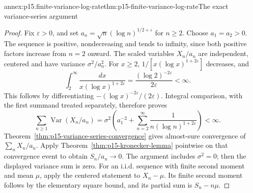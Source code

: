 \begin{annexitem}{annex:p15.finite-variance-log-rate}{thm:p15-finite-variance-log-rate}{The exact variance-series argument}
\begin{proof}
Fix \(\varepsilon>0\), and set
\(a_n=\sqrt n(\log n)^{1/2+\varepsilon}\) for \(n\geq2\).
Choose \(a_1=a_2>0\). The sequence is positive, nondecreasing
and tends to infinity, since both positive factors increase from
\(n=2\) onward. The scaled variables \(X_n/a_n\) are independent,
centered and have variance \(\sigma^2/a_n^2\).
For \(x\geq2\), \(1/[x(\log x)^{1+2\varepsilon}]\) decreases,
and
\[
 \int_2^\infty\frac{dx}{x(\log x)^{1+2\varepsilon}}
       =\frac{(\log2)^{-2\varepsilon}}{2\varepsilon}<\infty.
\]
This follows by differentiating
\(-(\log x)^{-2\varepsilon}/(2\varepsilon)\).
Integral comparison, with the first summand treated separately,
therefore proves
\[
 \sum_{n\geq1}\operatorname{Var}(X_n/a_n)
  =\sigma^2\left(a_1^{-2}
       +\sum_{n=2}^\infty\frac1{n(\log n)^{1+2\varepsilon}}\right)
  <\infty.
\]
Theorem~\ref{thm:p15-variance-series-convergence} gives almost-sure
convergence of \(\sum_nX_n/a_n\). Apply
Theorem~\ref{thm:p15-kronecker-lemma} pointwise on that convergence
event to obtain \(S_n/a_n\to0\).
The argument includes \(\sigma^2=0\); then the displayed variance
sum is zero. For an i.i.d. sequence with finite second moment and
mean \(\mu\), apply the centered statement to \(X_n-\mu\).
Its finite second moment follows by the elementary square bound,
and its partial sum is \(S_n-n\mu\).
\end{proof}
\end{annexitem}

